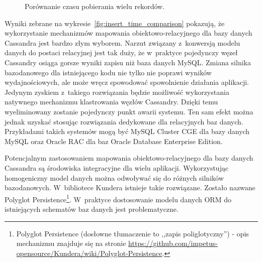 \begin{figure}
	\centering

	\caption{Porównanie czasu pobierania wielu rekordów.}
	\label{fig:select_time_comparison}
\end{figure}

Wyniki zebrane na wykresie~\ref{fig:insert_time_comparison} pokazują, że wykorzystanie mechanizmów mapowania obiektowo-relacyjnego dla bazy danych Cassandra jest bardzo złym wyborem. Narzut związany z~konwersją modelu danych do postaci relacyjnej jest tak duży, że w~praktyce pojedynczy węzeł Cassandry osiąga gorsze wyniki zapisu niż baza danych MySQL. Zmiana silnika bazodanowego dla istniejącego kodu nie tylko nie poprawi wyników wydajnościowych, ale może wręcz spowodować spowolnienie działania aplikacji. Jedynym zyskiem z~takiego rozwiązania będzie możliwość wykorzystania natywnego mechanizmu klastrowania węzłów Cassandry. Dzięki temu wyeliminowany zostanie pojedynczy punkt awarii systemu. Ten sam efekt można jednak uzyskać stosując rozwiązania dedykowane dla relacyjnych baz danych. Przykładami takich systemów mogą być MySQL Cluster CGE dla bazy danych MySQL oraz Oracle RAC dla baz Oracle Database Enterprise Edition.

Potencjalnym zastosowaniem mapowania obiektowo-relacyjnego dla bazy danych Cassandra są środowiska integracyjne dla wielu aplikacji. Wykorzystując homogeniczny model danych można odwoływać się do różnych silników bazodanowych. W~bibliotece Kundera istnieje takie rozwiązane. Zostało nazwane Polyglot Persistence\footnote{Polyglot Persistence (dosłowne tłumaczenie to ,,zapis poliglotyczny'') - opis mechanizmu znajduje się na stronie \url{https://github.com/impetus-opensource/Kundera/wiki/Polyglot-Persistence}.}. W~praktyce dostosowanie modelu danych ORM do istniejących schematów baz danych jest problematyczne.  


